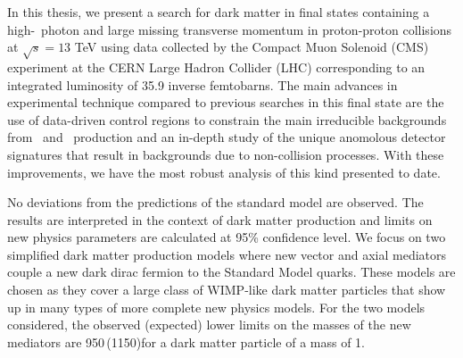 % 
% 
%

In this thesis, we present a search for dark matter in final states containing a high-\pt\ photon and large missing transverse momentum in proton-proton collisions at $\sqrt{s} = 13$ TeV using data collected by the Compact Muon Solenoid (CMS) experiment at the CERN Large Hadron Collider (LHC) corresponding to an integrated luminosity of 35.9 inverse femtobarns.
The main advances in experimental technique compared to previous searches in this final state are the use of data-driven control regions to constrain the main irreducible backgrounds from \zinvg\ and \wlng\ production and an in-depth study of the unique anomolous detector signatures that result in backgrounds due to non-collision processes.
With these improvements, we have the most robust analysis of this kind presented to date.

No deviations from the predictions of the standard model are observed. 
The results are interpreted in the context of dark matter production and limits on new physics parameters are calculated at 95\% confidence level.
We focus on two simplified dark matter production models where new vector and axial mediators couple a new dark dirac fermion to the Standard Model quarks.
These models are chosen as they cover a large class of WIMP-like dark matter particles that show up in many types of more complete new physics models. 
For the two models considered, the observed (expected) lower limits on the masses of the new mediators are  950\,(1150)\GeV for a dark matter particle of a mass of 1\GeV.
